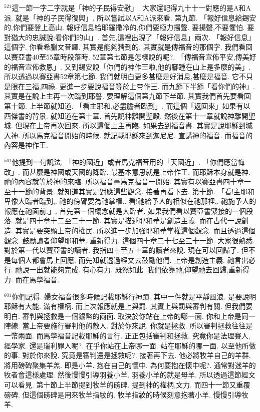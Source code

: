 \documentclass{book}
\begin{document}
$^{521}$這一節一字二字就是「神的子民得安慰」.
大家還記得九十十一對應的是A和A派.
就是「神的子民得復興」.
所以嘗試以A和A派來看.
第九節.
「報好信息給錫安的,你們要登上高山.
報好信息給耶羅撒冷的,你們要極力揚聲.
要揚聲,不要懼怕.
要對猶大的忠誠說:看你們的山」.
首先,這裡出現了「報好信息」兩次.
「報好信息」這個字.
你看希臘文音譯.
其實是能夠猜到的.
其實就是傳福音的那個字.
我們看回以賽亞書40至55章時段落時.
52章第七節是怎樣說的呢?.
「傳福音宣佈平安,傳美好的福音宣佈救恩」.
又到錫安說「你們的神作王啦,他的腳踵在山上是多麼的美」.
所以透過以賽亞書52章第七節.
我們就明白更多甚麼是好消息,甚麼是福音.
它不只是限在三福,四祿.
更進一步要說福音等於上帝作王.
而九節下半節「看你們的神」.
其實是在說上主再一次臨到耶誓.
要理解這個第九節下半節.
其實我們首先要看回第十節.
上半節就知道.
「看主耶和,必盡膽者臨到」.
而這個「返回來」如果有以西傑書的背景.
就知道在第十章.
首先說神離開聖殿.
然後在第十一章就說神離開聖城.
但現在上帝再次回來.
所以這個上主再臨.
如果去到福音書.
其實是說耶穌到城入神.
所以馬克福音開始的時候.
就記載耶穌來到迦尼尼.
宣講神的福音.
而福音的內容是神作王.

$^{561}$他提到一句說法.
「神的國近」或者馬克福音用的「天國近」.
「你們應當悔改」.
而甚麼是神國或天國的降臨.
最基本意思就是上帝作王.
而耶穌本身就是神.
祂的內容就等於神的來臨.
所以福音書馬克福音一開始.
其實有以賽亞書四十章一至十一節的背景.
就知道其實是對應這些觀念.
接著再看下去.
第十節.
「看!主耶和卑像大臨者臨到,.
祂的傍臂要為祂掌權..
看!祂給予人的相似在祂那裡,.
祂施予人的報應在祂面前.」.
首先第一個概念就是大臨者.
如果我們看以賽亞書緊接的一個段落.
就是四十章十二至二十一節.
其實是描述耶和華是創造主義.
而在古代一說創造.
其實是要突顯上帝的權民.
所以進一步加強耶和華掌權這個觀念.
而且透過這個觀念.
鼓勵讀者仰望耶和華.
重新得力.
這個四十章二十七至三十一節.
大家很熟悉.
對於第一代以賽亞書的讀者.
我指四十至五十章的讀者來說.
現在可以回歸了.
但不是每個人都會馬上回應.
而先知就透過經文去鼓勵他們.
上帝是創造主義.
祂言出必行.
祂說一出就能夠完成.
有心有力.
既然如此.
我們依靠祂,仰望祂去回歸,重新得力.
而在馬學福音.

$^{601}$你們記得.
婦女福音很多時候記載耶穌行神蹟.
其中一件就是平靜風浪.
是要說明耶穌有大能.
滿有權柄.
而上次報應就是上與罰.
其實上與罰與審判有關.
但我們要明白.
審判與拯救是一個銀幣的兩面.
取決於你站在上帝的哪一面.
你和上帝是同一陣線.
當上帝要施行審判他的敵人.
對於你來說.
你就是拯救.
所以審判拯救往往是一幣兩面.
而馬學福音記載耶穌的言行.
正正包括審判和拯救.
究竟你是法理賽人,經學家.
還是瑞利罪人呢?.
在乎你站在上帝哪一面.
站在耶穌的哪一面.
以至他所做的事.
對於你來說.
究竟是審判還是拯救呢?.
接著再下去.
他必將牧羊自己的羊群.
將用磅碑聚集羊羔.
即是小羊.
抱在自己的懷中.
為何要抱在懷中呢?.
通常對迷羊的牧者會這樣處理.
然後慢慢引導羽養小羊.
羽養小羊的就是母羊.
所以透過這節經文可以看見.
第十節上半節提到牧羊的磅碑.
提到神的權柄,文力.
而四十一節又重覆磅碑.
但這個磅碑是用來牧羊指紋的.
牧羊指紋的時候刻意抱著小羊.
慢慢引導牧羊.
\end{document}
